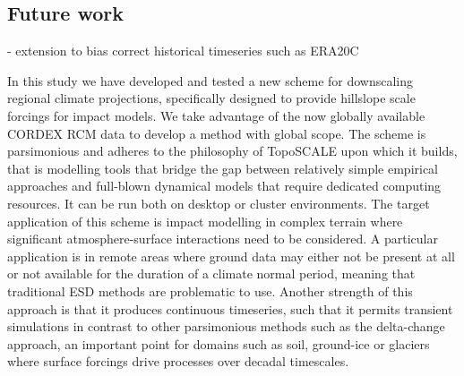 \documentclass[hess, manuscript]{copernicus}
\begin{document}
\subsection{Future work}
- extension to bias correct historical timeseries such as ERA20C








\conclusions  %
In this study we have developed and tested a new scheme for downscaling regional climate projections, specifically designed to provide hillslope scale forcings for impact models. We take advantage of the now globally available CORDEX RCM data to develop a method with global scope. The scheme is parsimonious and adheres to the philosophy of TopoSCALE upon which it builds, that is modelling tools that bridge the gap between relatively simple empirical approaches and full-blown dynamical models that require dedicated computing resources. It can be run both on desktop or cluster environments. The target application of this scheme is impact modelling in complex terrain where significant atmosphere-surface interactions need to be considered. A particular application is in remote areas where ground data may either not be present at all or not available for the duration of a climate normal period, meaning that traditional ESD methods are problematic to use. Another strength of this approach is that it produces continuous timeseries, such that it permits transient simulations in contrast to other parsimonious methods such as the delta-change approach, an important point for domains such as soil, ground-ice or glaciers  where surface forcings drive processes over decadal timescales. 
\end{document}
